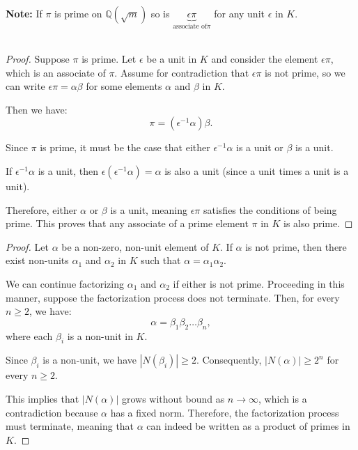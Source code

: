 \documentclass{article}
\begin{document}
\textbf{Note:} If $\pi$  is prime on $\mathbb{Q}(\sqrt{m})$ so is $\underbrace{\epsilon \pi}_{\text{associate of} \pi}$ for any unit $\epsilon$ in $K$.\\\\
\begin{proof}
    Suppose \( \pi \) is prime. Let \( \epsilon \) be a unit in \( K \) and consider the element \( \epsilon \pi \), which is an associate of \( \pi \). Assume for contradiction that \( \epsilon \pi \) is not prime, so we can write \( \epsilon \pi = \alpha \beta \) for some elements \( \alpha \) and \( \beta \) in \( K \).

Then we have:
\[
\pi = (\epsilon^{-1} \alpha) \beta.
\]

Since \( \pi \) is prime, it must be the case that either \( \epsilon^{-1} \alpha \) is a unit or \( \beta \) is a unit. 

If \( \epsilon^{-1} \alpha \) is a unit, then \( \epsilon (\epsilon^{-1} \alpha) = \alpha \) is also a unit (since a unit times a unit is a unit). 

Therefore, either \( \alpha \) or \( \beta \) is a unit, meaning \( \epsilon \pi \) satisfies the conditions of being prime. This proves that any associate of a prime element \( \pi \) in \( K \) is also prime.
\end{proof}




\begin{proof}
    Let \( \alpha \) be a non-zero, non-unit element of \( K \). If \( \alpha \) is not prime, then there exist non-units \( \alpha_1 \) and \( \alpha_2 \) in \( K \) such that \( \alpha = \alpha_1 \alpha_2 \).

    We can continue factorizing \( \alpha_1 \) and \( \alpha_2 \) if either is not prime. Proceeding in this manner, suppose the factorization process does not terminate. Then, for every \( n \geq 2 \), we have:
    \[
    \alpha = \beta_1 \beta_2 \dots \beta_n,
    \]
    where each \( \beta_i \) is a non-unit in \( K \).
    
    Since \( \beta_i \) is a non-unit, we have \( |N(\beta_i)| \geq 2 \). Consequently, \( |N(\alpha)| \geq 2^n \) for every \( n \geq 2 \).
    
    This implies that \( |N(\alpha)| \) grows without bound as \( n \to \infty \), which is a contradiction because \( \alpha \) has a fixed norm. Therefore, the factorization process must terminate, meaning that \( \alpha \) can indeed be written as a product of primes in \( K \).
\end{proof}
\end{document}
